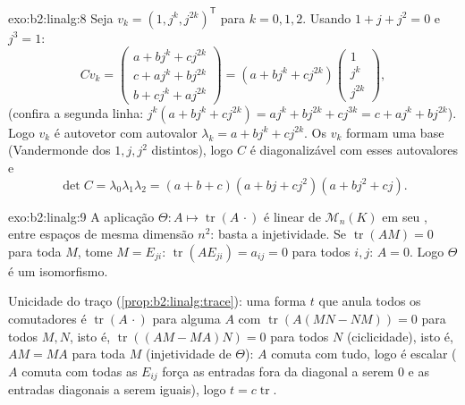 \begin{solution}{exo:b2:linalg:8}
Seja $v_k = (1, j^k, j^{2k})^{\mathsf T}$ para $k = 0, 1, 2$. Usando $1
+ j + j^2 = 0$ e $j^3 = 1$:
\[
C v_k =
\begin{pmatrix}
a + b j^k + c j^{2k}\\
c + a j^k + b j^{2k}\\
b + c j^k + a j^{2k}
\end{pmatrix}
= (a + b j^k + c j^{2k})
\begin{pmatrix} 1\\ j^k\\ j^{2k}\end{pmatrix},
\]
(confira a segunda linha: $j^k(a + bj^k + cj^{2k}) = aj^k + bj^{2k} +
cj^{3k} = c + aj^k + bj^{2k}$). Logo $v_k$ é autovetor com
autovalor $\lambda_k = a + bj^k + cj^{2k}$. Os $v_k$ formam uma base
(Vandermonde dos $1, j, j^2$ distintos), logo $C$ é diagonalizável
com esses autovalores e
\[
\det C = \lambda_0\lambda_1\lambda_2
= (a+b+c)(a + bj + cj^2)(a + bj^2 + cj).
\]
\end{solution}

\begin{solution}{exo:b2:linalg:9}
A aplicação $\Theta \colon A \mapsto \operatorname{tr}(A\,\cdot)$ é
linear de $\mathcal{M}_n(K)$ em seu , entre espaços de mesma
dimensão $n^2$: basta a injetividade. Se $\operatorname{tr}(AM) =
0$ para toda $M$, tome $M = E_{ji}$: $\operatorname{tr}(A E_{ji}) =
a_{ij} = 0$ para todos $i, j$: $A = 0$. Logo $\Theta$ é um isomorfismo.

Unicidade do traço (\cref{prop:b2:linalg:trace}): uma forma $t$
que anula todos os comutadores é $\operatorname{tr}(A\,\cdot)$ para alguma
$A$ com $\operatorname{tr}(A(MN - NM)) = 0$ para todos $M, N$, isto é,
$\operatorname{tr}((AM - MA)N) = 0$ para todos $N$ (ciclicidade), isto é,
$AM = MA$ para toda $M$ (injetividade de $\Theta$): $A$ comuta com
tudo, logo é escalar ($A$ comuta com todas as $E_{ij}$ força
as entradas fora da diagonal a serem $0$ e as entradas diagonais a serem iguais), logo $t = c
\operatorname{tr}$.
\end{solution}

